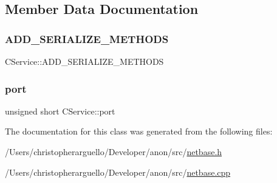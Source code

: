 \subsection{Member Data Documentation}
\mbox{\label{class_c_service_a3347aa84bd8f98ae853307ad4e47a4f5}} 
\subsubsection{\texorpdfstring{A\+D\+D\+\_\+\+S\+E\+R\+I\+A\+L\+I\+Z\+E\+\_\+\+M\+E\+T\+H\+O\+DS}{ADD\_SERIALIZE\_METHODS}}
{\footnotesize\ttfamily C\+Service\+::\+A\+D\+D\+\_\+\+S\+E\+R\+I\+A\+L\+I\+Z\+E\+\_\+\+M\+E\+T\+H\+O\+DS}

\mbox{\label{class_c_service_aef17734203dc2125cbdf4d23e50be410}} 
\subsubsection{\texorpdfstring{port}{port}}
{\footnotesize\ttfamily unsigned short C\+Service\+::port\hspace{0.3cm}{\ttfamily [protected]}}



The documentation for this class was generated from the following files\+:\begin{DoxyCompactItemize}
\item 
/\+Users/christopherarguello/\+Developer/anon/src/\mbox{\hyperlink{netbase_8h}{netbase.\+h}}\item 
/\+Users/christopherarguello/\+Developer/anon/src/\mbox{\hyperlink{netbase_8cpp}{netbase.\+cpp}}\end{DoxyCompactItemize}
